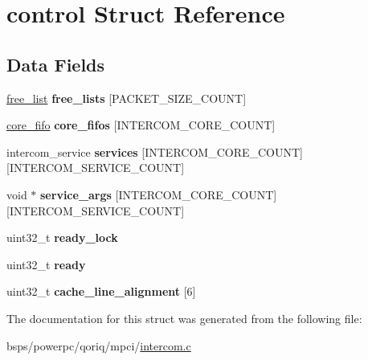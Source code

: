 \hypertarget{structcontrol}{}\section{control Struct Reference}
\label{structcontrol}
\subsection*{Data Fields}
\begin{DoxyCompactItemize}
\item 
\mbox{\label{structcontrol_ad4515a47936e01b8d930aace4253ae2e}} 
\mbox{\hyperlink{structfree__list}{free\+\_\+list}} {\bfseries free\+\_\+lists} \mbox{[}P\+A\+C\+K\+E\+T\+\_\+\+S\+I\+Z\+E\+\_\+\+C\+O\+U\+NT\mbox{]}
\item 
\mbox{\label{structcontrol_a5c48cc28a699406de1d195bb67adbaa5}} 
\mbox{\hyperlink{structcore__fifo}{core\+\_\+fifo}} {\bfseries core\+\_\+fifos} \mbox{[}I\+N\+T\+E\+R\+C\+O\+M\+\_\+\+C\+O\+R\+E\+\_\+\+C\+O\+U\+NT\mbox{]}
\item 
\mbox{\label{structcontrol_a1da30c7a4a2bd8d85516b6546513915c}} 
intercom\+\_\+service {\bfseries services} \mbox{[}I\+N\+T\+E\+R\+C\+O\+M\+\_\+\+C\+O\+R\+E\+\_\+\+C\+O\+U\+NT\mbox{]}\mbox{[}I\+N\+T\+E\+R\+C\+O\+M\+\_\+\+S\+E\+R\+V\+I\+C\+E\+\_\+\+C\+O\+U\+NT\mbox{]}
\item 
\mbox{\label{structcontrol_a7f24ca1d4573d45f97ad4871031fd174}} 
void $\ast$ {\bfseries service\+\_\+args} \mbox{[}I\+N\+T\+E\+R\+C\+O\+M\+\_\+\+C\+O\+R\+E\+\_\+\+C\+O\+U\+NT\mbox{]}\mbox{[}I\+N\+T\+E\+R\+C\+O\+M\+\_\+\+S\+E\+R\+V\+I\+C\+E\+\_\+\+C\+O\+U\+NT\mbox{]}
\item 
\mbox{\label{structcontrol_aab080f92be044da9ffb292fc80a2a2bc}} 
uint32\+\_\+t {\bfseries ready\+\_\+lock}
\item 
\mbox{\label{structcontrol_adf4e87bba5aef40345fa75e290b95716}} 
uint32\+\_\+t {\bfseries ready}
\item 
\mbox{\label{structcontrol_a9af2e01e557ea8b566475bd357bedbc5}} 
uint32\+\_\+t {\bfseries cache\+\_\+line\+\_\+alignment} \mbox{[}6\mbox{]}
\end{DoxyCompactItemize}


The documentation for this struct was generated from the following file\+:\begin{DoxyCompactItemize}
\item 
bsps/powerpc/qoriq/mpci/\mbox{\hyperlink{intercom_8c}{intercom.\+c}}\end{DoxyCompactItemize}
